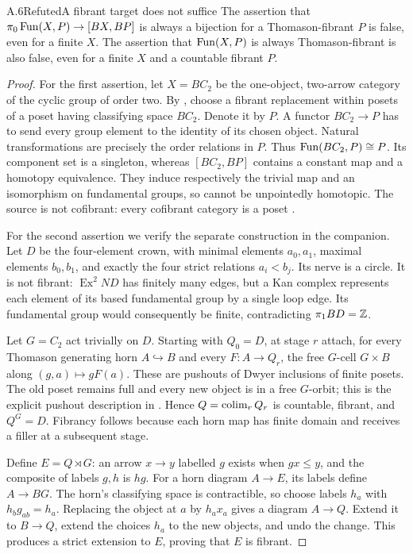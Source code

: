 \begin{claim}{A.6}{Refuted}{A fibrant target does not suffice}
The assertion that $\pi_0\operatorname{Fun}(X,P)\to[BX,BP]$ is always a bijection for a Thomason-fibrant $P$ is false, even for a finite $X$. The assertion that $\operatorname{Fun}(X,P)$ is always Thomason-fibrant is also false, even for a finite $X$ and a countable fibrant $P$.
\end{claim}
\begin{proof}
For the first assertion, let $X=B C_2$ be the one-object, two-arrow category of the cyclic group of order two. By \citet[Theorem~2.6]{Raptis2010}, choose a fibrant replacement within posets of a poset having classifying space $BC_2$. Denote it by $P$. A functor $BC_2\to P$ has to send every group element to the identity of its chosen object. Natural transformations are precisely the order relations in $P$. Thus $\operatorname{Fun}(BC_2,P)\cong P$. Its component set is a singleton, whereas $[BC_2,BP]$ contains a constant map and a homotopy equivalence. They induce respectively the trivial map and an isomorphism on fundamental groups, so cannot be unpointedly homotopic. The source is not cofibrant: every cofibrant category is a poset \citep[Proposition~5.7]{Thomason1980}.

For the second assertion we verify the separate construction in the companion. Let $D$ be the four-element crown, with minimal elements $a_0,a_1$, maximal elements $b_0,b_1$, and exactly the four strict relations $a_i<b_j$. Its nerve is a circle. It is not fibrant: $\operatorname{Ex}^2ND$ has finitely many edges, but a Kan complex represents each element of its based fundamental group by a single loop edge. Its fundamental group would consequently be finite, contradicting $\pi_1BD=\mathbb Z$.

Let $G=C_2$ act trivially on $D$. Starting with $Q_0=D$, at stage $r$ attach, for every Thomason generating horn $A\hookrightarrow B$ and every $F:A\to Q_r$, the free $G$-cell $G\times B$ along $(g,a)\mapsto gF(a)$. These are pushouts of Dwyer inclusions of finite posets. The old poset remains full and every new object is in a free $G$-orbit; this is the explicit pushout description in \citet[Lemmas~4.7--4.8]{MayStephanZakharevich2017}. Hence $Q=\operatorname{colim}_rQ_r$ is countable, fibrant, and $Q^G=D$. Fibrancy follows because each horn map has finite domain and receives a filler at a subsequent stage.

Define $E=Q\rtimes G$: an arrow $x\to y$ labelled $g$ exists when $gx\leq y$, and the composite of labels $g,h$ is $hg$. For a horn diagram $A\to E$, its labels define $A\to BG$. The horn's classifying space is contractible, so choose labels $h_a$ with $h_bg_{ab}=h_a$. Replacing the object at $a$ by $h_a x_a$ gives a diagram $A\to Q$. Extend it to $B\to Q$, extend the choices $h_a$ to the new objects, and undo the change. This produces a strict extension to $E$, proving that $E$ is fibrant.


\end{proof}
